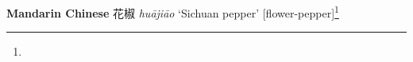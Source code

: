 \begin{etymology}\label{ety:huajiao}
\textbf{Mandarin Chinese} {花椒} \textit{huā​jiāo} `Sichuan pepper' [flower-pepper]\footnote{}
\end{etymology}